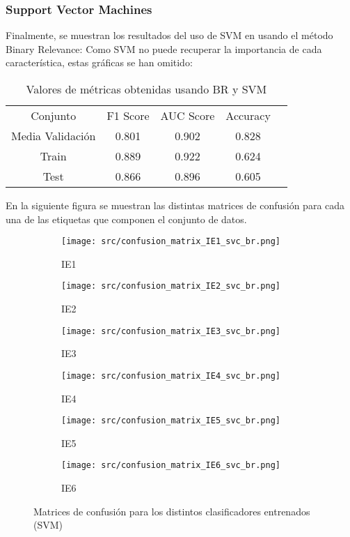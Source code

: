 \subsubsection*{Support Vector Machines}
Finalmente, se muestran los resultados del uso de SVM en usando el método Binary Relevance:
Como SVM no puede recuperar la importancia de cada característica, estas gráficas se han omitido:
\begin{table}[H]
	\centering
	\begin{tabular}{|c|c|c|c|c}
		\cline{1-4}
		Conjunto         & F1 Score & AUC Score & Accuracy \\ \cline{1-4}
		Media Validación & 0.801    & 0.902     & 0.828    \\ \cline{1-4}
		Train            & 0.889    & 0.922     & 0.624    \\ \cline{1-4}
		Test             & 0.866    & 0.896     & 0.605    \\ \cline{1-4}
	\end{tabular}
	\caption{Valores de métricas obtenidas usando BR y SVM}
\end{table}
En la siguiente figura se muestran las distintas matrices de confusión para cada una de las etiquetas que componen el conjunto de datos.\linebreak
\begin{figure}[H]
	\centering
	\begin{subfigure}[b]{0.3\textwidth}
		\centering
		\texttt{[image: src/confusion\_matrix\_IE1\_svc\_br.png]}
		\caption{IE1}
	\end{subfigure}
	\hfill
	\begin{subfigure}[b]{0.3\textwidth}
		\centering
		\texttt{[image: src/confusion\_matrix\_IE2\_svc\_br.png]}
		\caption{IE2}
	\end{subfigure}
	\hfill
	\begin{subfigure}[b]{0.3\textwidth}
		\centering
		\texttt{[image: src/confusion\_matrix\_IE3\_svc\_br.png]}
		\caption{IE3}
	\end{subfigure}
	\hfill
	\begin{subfigure}[b]{0.3\textwidth}
		\centering
		\texttt{[image: src/confusion\_matrix\_IE4\_svc\_br.png]}
		\caption{IE4}
	\end{subfigure}
	\hfill
	\begin{subfigure}[b]{0.3\textwidth}
		\centering
		\texttt{[image: src/confusion\_matrix\_IE5\_svc\_br.png]}
		\caption{IE5}
	\end{subfigure}
	\hfill
	\begin{subfigure}[b]{0.3\textwidth}
		\centering
		\texttt{[image: src/confusion\_matrix\_IE6\_svc\_br.png]}
		\caption{IE6}
	\end{subfigure}
	\caption{Matrices de confusión para los distintos clasificadores entrenados (SVM)}
	\label{fig:ml_conf_matrix_svc}
\end{figure}
\pagebreak
